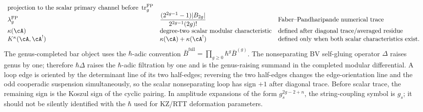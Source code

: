 \begin{convention}
\[\begin{array}{lll}
 \text{projection to the scalar primary channel before }\operatorname{tr}^{\mathrm{FP}}_g \\
\lambda_g^{\mathrm{FP}} &
 \dfrac{(2^{2g-1}-1)|B_{2g}|}{2^{2g-1}(2g)!} &
 \text{Faber--Pandharipande numerical trace} \\
\kappa(\cA) & \text{degree-two scalar modular characteristic} &
 \text{defined after diagonal trace/averaged residue} \\
K^\kappa(\cA,\cA^!) &
 \kappa(\cA)+\kappa(\cA^!) &
 \text{defined only when both scalar characteristics exist.}
\end{array}
\]
The genus-completed bar object uses the $\hbar$-adic convention
$\bar B^{\mathrm{full}}=\prod_{g\ge0}\hbar^g\bar B^{(g)}$.  The
nonseparating BV self-gluing operator $\Delta$ raises genus by one;
therefore $\hbar\Delta$ raises the $\hbar$-adic filtration by one and is
the genus-raising summand in the completed modular differential.  A
loop edge is oriented by the determinant line of its two half-edges;
reversing the two half-edges changes the edge-orientation line and the
odd cooperadic suspension simultaneously, so the scalar
nonseparating loop has sign \(+1\) after diagonal trace.  Before scalar
trace, the remaining sign is the Koszul sign of the cyclic pairing.  In
amplitude expansions of the form $g_s^{2g-2+n}$, the string-coupling
symbol is $g_s$; it should not be silently identified with the
$\hbar$ used for KZ/RTT deformation parameters.
\end{convention}
